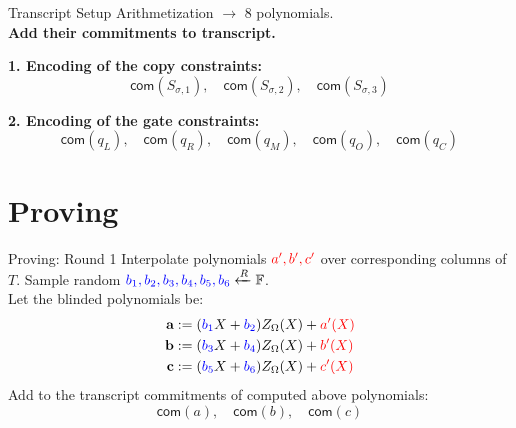 \documentclass{zkdl-presentation-template}
\begin{document}
    \begin{frame}{Transcript Setup}
        Arithmetization $\rightarrow$ 8 polynomials. \\ 
        \textbf{Add their commitments to transcript.}
        \vspace{1em}
        
        \textbf{1. Encoding of the copy constraints:}
        \begin{equation*}
            \mathsf{com}(S_{\sigma,1}), \quad \mathsf{com}(S_{\sigma,2}), \quad \mathsf{com}(S_{\sigma,3})
        \end{equation*}
        
        \textbf{2. Encoding of the gate constraints:}
        \begin{equation*}
            \mathsf{com}(q_L), \quad \mathsf{com}(q_R), \quad \mathsf{com}(q_M), \quad 
            \mathsf{com}(q_O), \quad \mathsf{com}(q_C)
        \end{equation*}
    \end{frame}    

    \section{Proving}

    \begin{frame} {Proving: Round 1}
        Interpolate polynomials $\textcolor{red}{a', b', c'}$ over corresponding columns of $T$.
        Sample random $\textcolor{blue}{b_1, b_2, b_3, b_4, b_5, b_6} \xleftarrow{R} \mathbb{F}$. \\
        \vspace{1em}
        Let the blinded polynomials be:
        \begin{align*}
        \centering
            \textbf{a} &:= (\textcolor{blue}{b_1} X + \textcolor{blue}{b_2})Z_{\Omega}(X) + \textcolor{red}{a'(X)} \\
            \textbf{b} &:= (\textcolor{blue}{b_3} X + \textcolor{blue}{b_4})Z_{\Omega}(X) + \textcolor{red}{b'(X)} \\
            \textbf{c} &:= (\textcolor{blue}{b_5} X + \textcolor{blue}{b_6})Z_{\Omega}(X) + \textcolor{red}{c'(X)}
        \end{align*}
        Add to the transcript commitments of computed above polynomials:
        \begin{equation*}
            \mathsf{com}(a), \quad \mathsf{com}(b), \quad \mathsf{com}(c)
        \end{equation*}
    \end{frame}
\end{document}
